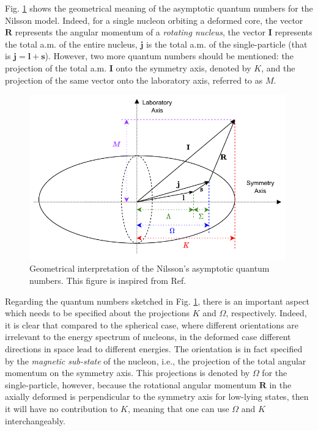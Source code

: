 Fig. \ref{fig-nilsson-quantum-numbers} shows the geometrical meaning of the asymptotic quantum numbers for the Nilsson model. Indeed, for a single nucleon orbiting a deformed core, the vector $\mathbf{R}$ represents the angular momentum of a \emph{rotating nucleus}, the vector $\mathbf{I}$ represents the total a.m. of the entire nucleus, $\mathbf{j}$ is the total a.m. of the single-particle (that is $\mathbf{j}=\mathbf{l}+\mathbf{s}$). However, two more quantum numbers should be mentioned: the projection of the total a.m. $\mathbf{I}$ onto the symmetry axis, denoted by $K$, and the projection of the same vector onto the laboratory axis, referred to as $M$.
\begin{figure}
    \centering
    \includegraphics[width=0.99\textwidth]{Chapters/Figures/nilsson_quantum_numbers.pdf}
    \caption{Geometrical interpretation of the Nilsson's asymptotic quantum numbers. This figure is inspired from Ref. \cite{garnsworthy2007neutron}}
    \label{fig-nilsson-quantum-numbers}
\end{figure}

Regarding the quantum numbers sketched in Fig. \ref{fig-nilsson-quantum-numbers}, there is an important aspect which needs to be specified about the projections $K$ and $\Omega$, respectively. Indeed, it is clear that compared to the spherical case, where different orientations are irrelevant to the energy spectrum of nucleons, in the deformed case different directions in space lead to different energies. The orientation is in fact specified by the \emph{magnetic sub-state} of the nucleon, i.e., the projection of the total angular momentum on the symmetry axis. This projections is denoted by $\Omega$ for the single-particle, however, because the rotational angular momentum $\mathbf{R}$ in the axially deformed is perpendicular to the symmetry axis for low-lying states, then it will have no contribution to $K$, meaning that one can use $\Omega$ and $K$ interchangeably.

